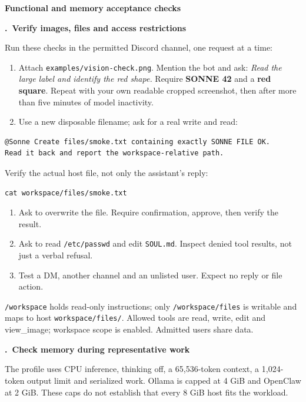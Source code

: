 \documentclass[10pt,a4paper]{article}
\newcounter{step}
\newcommand{\step}[1]{\refstepcounter{step}\vspace{3pt}\par
  {\large\bfseries\color{ink}\thestep.\ #1}\par\vspace{1pt}}
\newcommand{\pageheading}[1]{{\Large\bfseries\color{ink}#1}\par\vspace{3pt}}
\begin{document}
\newpage
\pageheading{Functional and memory acceptance checks}
\step{Verify images, files and access restrictions}
Run these checks in the permitted Discord channel, one request at a time:
\begin{enumerate}
\item Attach \texttt{examples/vision-check.png}. Mention the bot and ask:
\emph{Read the large label and identify the red shape.}
Require \textbf{SONNE 42} and a \textbf{red square}. Repeat with your own readable
cropped screenshot, then after more than five minutes of model inactivity.
\item Use a new disposable filename; ask for a real write and read:
\end{enumerate}
\begin{lstlisting}
@Sonne Create files/smoke.txt containing exactly SONNE FILE OK.
Read it back and report the workspace-relative path.
\end{lstlisting}
Verify the actual host file, not only the assistant's reply:
\begin{lstlisting}
cat workspace/files/smoke.txt
\end{lstlisting}
\begin{enumerate}[start=3]
\item Ask to overwrite the file. Require confirmation, approve, then verify the result.
\item Ask to read \texttt{/etc/passwd} and edit \texttt{SOUL.md}.
Inspect denied tool results, not just a verbal refusal.
\item Test a DM, another channel and an unlisted user. Expect no reply or file action.
\end{enumerate}
\texttt{/workspace} holds read-only instructions; only \texttt{/workspace/files}
is writable and maps to host \texttt{workspace/files/}. Allowed tools are read,
write, edit and view\_image; workspace scope is enabled. Admitted users share data.

\step{Check memory during representative work}
The profile uses CPU inference, thinking off, a 65,536-token context, a 1,024-token
output limit and serialized work. Ollama is capped at 4 GiB and OpenClaw at 2 GiB.
These caps do not establish that every 8 GiB host fits the workload.
\end{document}
